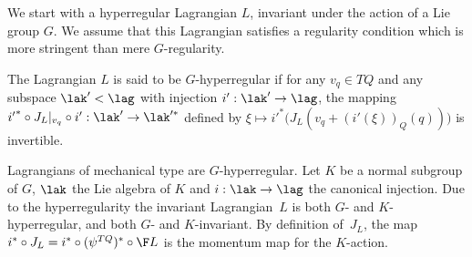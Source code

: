 We start with a hyperregular Lagrangian $L$, invariant under the action of a Lie group $G$. We assume that this Lagrangian satisf\/ies a regularity condition which is more stringent than mere $G$-regularity.
\begin{definition} The Lagrangian $L$ is said to be $G$-hyperregular if for any $v_q\in TQ$ and any subspace $\lak' <\lag$ with injection $i':\lak'\to \lag$,  the mapping ${i'}^*\circ J_L|_{v_q}\circ i':\lak' \to \lak'^*$ def\/ined by $\xi \mapsto {i'}^*\big(J_L(v_q+(i'(\xi))_Q(q))\big)$ is invertible.
\end{definition}
Lagrangians of mechanical type are $G$-hyperregular. Let $K$ be a normal subgroup of $G$, $\lak$ the Lie algebra of $K$ and $i:\lak\to \lag$ the canonical injection. Due to the hyperregularity the invariant Lagrangian~$L$ is both $G$- and $K$-hyperregular, and both $G$- and $K$-invariant. By def\/inition of~$J_L$, the map $i^*\circ J_L= i^*\circ (\psi^{TQ})^*\circ \F L$ is the momentum map for the $K$-action.

